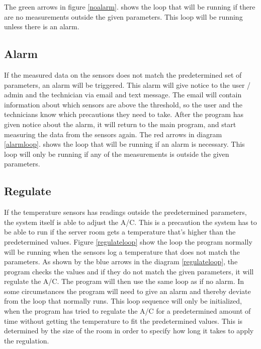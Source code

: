 The green arrows in figure \ref{noalarm}. shows the loop that will be running if there are no measurements outside the given parameters. This loop will be running unless there is an alarm.

\subsection{Alarm}
If the measured data on the sensors does not match the predetermined set of parameters, an alarm will be triggered. This alarm will give notice to the user / admin and the technician via email and text message. The email will contain information about which sensors are above the threshold, so the user and  the technicians know which precautions they need to take.
\newpage
After the program has given notice about the alarm, it will return to the main program, and start measuring the data from the sensors again.\newline
{}\newline
\newline
The red arrows in diagram \ref{alarmloop}. shows the loop that will be running if an alarm is necessary. This loop will only be running if any of the measurements is outside the given parameters.

\subsection{Regulate}
If the temperature sensors has readings outside the predetermined parameters, the system itself is able to adjust the A/C. This is a precaution the system has to be able to run if the server room gets a temperature that's higher than the predetermined values.\clearpage
{}
Figure \ref{regulateloop} show the loop the program normally will be running when the sensors log a temperature that does not match the parameters. As shown by the blue arrows in the diagram \ref{regulateloop}, the program checks the values and if they do not match the given parameters, it will regulate the A/C. The program will then use the same loop as if no alarm.
\newline
In some circumstances the program will need to give an alarm and thereby deviate from the loop that normally runs.  This loop sequence will only be initialized, when the program has tried to regulate the A/C for a predetermined amount of time without getting the temperature to fit the predetermined values.  This is determined by the size of the room in order to specify how long it takes to apply the regulation.